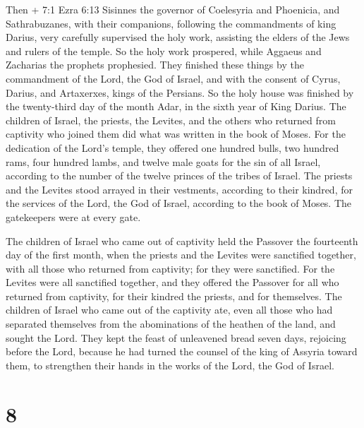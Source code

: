  Then + 7:1 Ezra 6:13 Sisinnes the governor of Coelesyria
and Phoenicia, and Sathrabuzanes, with their companions, following the
commandments of king Darius,  very carefully supervised the
holy work, assisting the elders of the Jews and rulers of the temple.
 So the holy work prospered, while Aggaeus and Zacharias the
prophets prophesied.  They finished these things by the
commandment of the Lord, the God of Israel, and with the consent of
Cyrus, Darius, and Artaxerxes, kings of the Persians.  So
the holy house was finished by the twenty-third day of the month Adar,
in the sixth year of King Darius.  The children of Israel,
the priests, the Levites, and the others who returned from captivity who
joined them did what was written in the book of Moses.  For
the dedication of the Lord's temple, they offered one hundred bulls, two
hundred rams, four hundred lambs,  and twelve male goats for
the sin of all Israel, according to the number of the twelve princes of
the tribes of Israel.  The priests and the Levites stood
arrayed in their vestments, according to their kindred, for the services
of the Lord, the God of Israel, according to the book of Moses. The
gatekeepers were at every gate.

 The children of Israel who came out of captivity held the
Passover the fourteenth day of the first month, when the priests and the
Levites were sanctified together,  with all those who
returned from captivity; for they were sanctified. For the Levites were
all sanctified together,  and they offered the Passover for
all who returned from captivity, for their kindred the priests, and for
themselves.  The children of Israel who came out of the
captivity ate, even all those who had separated themselves from the
abominations of the heathen of the land, and sought the Lord.
 They kept the feast of unleavened bread seven days,
rejoicing before the Lord,  because he had turned the
counsel of the king of Assyria toward them, to strengthen their hands in
the works of the Lord, the God of Israel.

\hypertarget{section-7}{%
\section{8}\label{section-7}}

